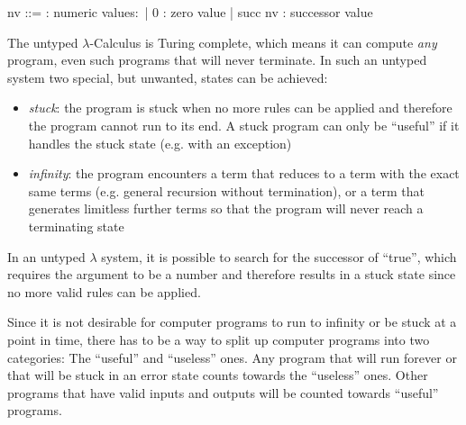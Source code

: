 \begin{bnfgrammar}
    nv ::= : numeric values$\colon$
    | 0 : zero value
    | succ nv : successor value
\end{bnfgrammar}

The untyped $\lambda$-Calculus is Turing complete,
which means it can compute \textit{any} program, even
such programs that will never terminate.
In such an untyped system two special, but unwanted, states can be achieved:

\begin{itemize}
    \item \textit{stuck}: the program is stuck when no more
          rules can be applied and therefore the program
          cannot run to its end. A stuck program can only be
          ``useful'' if it handles the stuck state (e.g. with an exception)
    \item \textit{infinity}: the program encounters a term that
          reduces to a term with the exact same terms
          (e.g. general recursion without termination), or a
          term that generates limitless further terms
          so that the program will never reach a terminating
          state
\end{itemize}

In an untyped $\lambda$ system, it is possible to search
for the successor of ``true'', which
requires the argument to be a number and therefore
results in a stuck state since no more valid rules
can be applied.

Since it is not desirable for computer programs to run to infinity or be stuck at a point in time,
there has to be a way to split up computer programs into two categories:
The ``useful'' and ``useless'' ones. Any program that will run forever
or that will be stuck in an error state counts towards the ``useless'' ones.
Other programs that have valid inputs and outputs will be counted towards ``useful''
programs.
